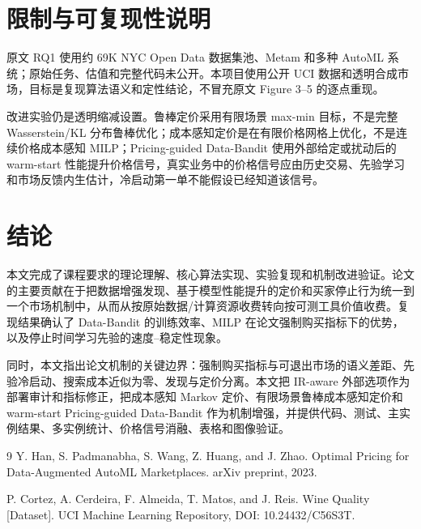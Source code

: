 \documentclass[11pt,a4paper]{ctexart}
\theoremstyle{definition}
\begin{document}
\section{限制与可复现性说明}

原文 RQ1 使用约 69K NYC Open Data 数据集池、Metam 和多种 AutoML 系统；原始任务、估值和完整代码未公开。本项目使用公开 UCI 数据和透明合成市场，目标是复现算法语义和定性结论，不冒充原文 Figure 3--5 的逐点重现。

改进实验仍是透明缩减设置。鲁棒定价采用有限场景 max-min 目标，不是完整 Wasserstein/KL 分布鲁棒优化；成本感知定价是在有限价格网格上优化，不是连续价格成本感知 MILP；Pricing-guided Data-Bandit 使用外部给定或扰动后的 warm-start 性能提升价格信号，真实业务中的价格信号应由历史交易、先验学习和市场反馈内生估计，冷启动第一单不能假设已经知道该信号。

\section{结论}

本文完成了课程要求的理论理解、核心算法实现、实验复现和机制改进验证。论文的主要贡献在于把数据增强发现、基于模型性能提升的定价和买家停止行为统一到一个市场机制中，从而从按原始数据/计算资源收费转向按可测工具价值收费。复现结果确认了 Data-Bandit 的训练效率、MILP 在论文强制购买指标下的优势，以及停止时间学习先验的速度--稳定性现象。

同时，本文指出论文机制的关键边界：强制购买指标与可退出市场的语义差距、先验冷启动、搜索成本近似为零、发现与定价分离。本文把 IR-aware 外部选项作为部署审计和指标修正，把成本感知 Markov 定价、有限场景鲁棒成本感知定价和 warm-start Pricing-guided Data-Bandit 作为机制增强，并提供代码、测试、主实例结果、多实例统计、价格信号消融、表格和图像验证。

\begin{thebibliography}{9}
Y. Han, S. Padmanabha, S. Wang, Z. Huang, and J. Zhao.
\newblock Optimal Pricing for Data-Augmented AutoML Marketplaces.
\newblock arXiv preprint, 2023.

P. Cortez, A. Cerdeira, F. Almeida, T. Matos, and J. Reis.
\newblock Wine Quality [Dataset].
\newblock UCI Machine Learning Repository, DOI: 10.24432/C56S3T.
\end{thebibliography}
\end{document}
